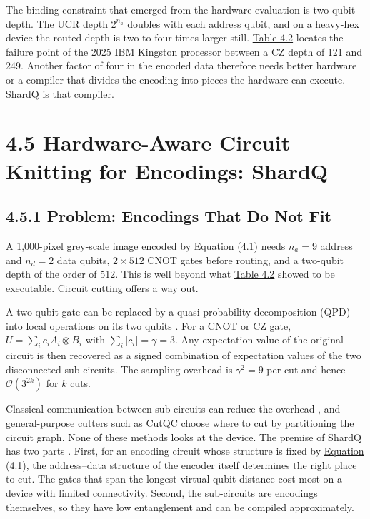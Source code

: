 \documentclass{report}
\theoremstyle{plain}
\theoremstyle{definition}
\theoremstyle{remark}
\newcommand{\bigO}[1]{\mathcal{O}\!\left(#1\right)}
\begin{document}
The binding constraint that emerged from the hardware evaluation is two-qubit depth. The UCR depth $2^{n_a}$ doubles with each address qubit, and on a heavy-hex device the routed depth is two to four times larger still. \hyperref[tab:qml:vqt-hw]{Table 4.2} locates the failure point of the 2025 IBM Kingston processor between a CZ depth of 121 and 249. Another factor of four in the encoded data therefore needs better hardware or a compiler that divides the encoding into pieces the hardware can execute. ShardQ is that compiler.

\section{4.5 Hardware-Aware Circuit Knitting for Encodings: ShardQ}\label{sec:qml:shardq}

\subsection{4.5.1 Problem: Encodings That Do Not Fit}\label{sec:qml:shardq:problem}

A 1,000-pixel grey-scale image encoded by \hyperref[eq:qml:qcrank]{Equation (4.1)} needs $n_a = 9$ address and $n_d = 2$ data qubits, $2 \times 512$ CNOT gates before routing, and a two-qubit depth of the order of 512. This is well beyond what \hyperref[tab:qml:vqt-hw]{Table 4.2} showed to be executable. Circuit cutting offers a way out.

A two-qubit gate can be replaced by a quasi-probability decomposition (QPD) into local operations on its two qubits \cite{mitarai2021virtualgate,peng2020circuitcutting,bravyi2016trading}. For a CNOT or CZ gate, $U = \sum_i c_i A_i \otimes B_i$ with $\sum_i |c_i| = \gamma = 3$. Any expectation value of the original circuit is then recovered as a signed combination of expectation values of the two disconnected sub-circuits. The sampling overhead is $\gamma^2 = 9$ per cut and hence $\bigO{3^{2k}}$ for $k$ cuts.

Classical communication between sub-circuits can reduce the overhead \cite{piveteau2024knitting}, and general-purpose cutters such as CutQC \cite{tang2021cutqc} choose where to cut by partitioning the circuit graph. None of these methods looks at the device. The premise of ShardQ has two parts \cite{guo2025shardq}. First, for an encoding circuit whose structure is fixed by \hyperref[eq:qml:qcrank]{Equation (4.1)}, the address--data structure of the encoder itself determines the right place to cut. The gates that span the longest virtual-qubit distance cost most on a device with limited connectivity. Second, the sub-circuits are encodings themselves, so they have low entanglement and can be compiled approximately.
\end{document}
